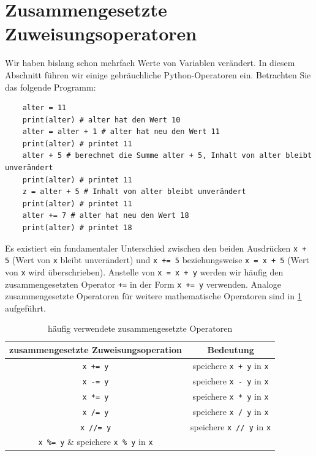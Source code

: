 \section{Zusammengesetzte Zuweisungsoperatoren}
Wir haben bislang schon mehrfach Werte von Variablen verändert. In diesem Abschnitt führen wir einige gebräuchliche Python-Operatoren ein. Betrachten Sie das folgende Programm:
\begin{lstlisting}
	alter = 11
	print(alter) # alter hat den Wert 10
	alter = alter + 1 # alter hat neu den Wert 11 
	print(alter) # printet 11
	alter + 5 # berechnet die Summe alter + 5, Inhalt von alter bleibt unverändert
	print(alter) # printet 11
	z = alter + 5 # Inhalt von alter bleibt unverändert 
	print(alter) # printet 11
	alter += 7 # alter hat neu den Wert 18
	print(alter) # printet 18 
\end{lstlisting}
Es existiert ein fundamentaler Unterschied zwischen den beiden Ausdrücken \lstinline|x + 5| (Wert von \lstinline|x| bleibt unverändert) und \lstinline|x += 5| beziehungsweise \lstinline|x = x + 5| (Wert von \lstinline|x| wird überschrieben). Anstelle von \lstinline|x = x + y| werden wir häufig den zusammengesetzten Operator \lstinline|+=| in der Form \lstinline|x += y| verwenden. Analoge zusammengesetzte Operatoren für weitere mathematische Operatoren sind in \cref{tab:zusammengesetzte_operationen} aufgeführt.

\begin{table}[H]
	\centering
	\begin{tabular}{c|c}
		\textbf{zusammengesetzte Zuweisungsoperation} & \textbf{Bedeutung}                            \\\midrule\midrule
		\lstinline|x += y|                            & speichere \lstinline|x + y| in \lstinline|x|  \\\midrule
		\lstinline|x -= y|                            & speichere \lstinline|x - y| in \lstinline|x|  \\\midrule
		\lstinline|x *= y|                            & speichere \lstinline|x * y| in \lstinline|x|  \\\midrule
		\lstinline|x /= y|                            & speichere \lstinline|x / y| in \lstinline|x|  \\\midrule
		\lstinline|x //= y|                           & speichere \lstinline|x // y| in \lstinline|x| \\\midrule
		\lstinline|x %= y|                            & speichere \lstinline|x % y| in \lstinline|x|
	\end{tabular}
	\caption{häufig verwendete zusammengesetzte Operatoren}
	\label{tab:zusammengesetzte_operationen}
\end{table}

